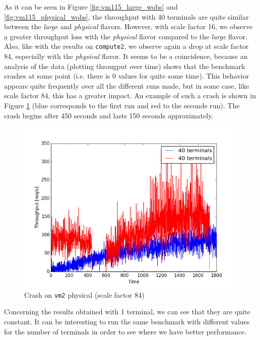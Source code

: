 As it can be seen in Figure \ref{fig:vm115_large_wobs} and \ref{fig:vm115_physical_wobs}, the throughput with 40 terminals are quite similar between the \textit{large} and \textit{physical} flavors. 
However, with scale factor 16, we observe a greater throughput loss with the \textit{physical} flavor compared to the \textit{large} flavor. 
Also, like with the results on \texttt{compute2}, we observe again a drop at scale factor 84, especially with the \textit{physical} flavor. 
It seems to be a coincidence, because an analysis of the data (plotting througput over time) shows that the benchmark crashes at some point (i.e. there is 0 values for quite some time).
This behavior appears quite frequently over all the different runs made, but in some case, like scale factor 84, this has a greater impact.
An example of such a crash is shown in Figure \ref{fig:vm115_physical_wobs_crash} (blue corresponds to the first run and red to the seconde run).
The crash begins after 450 seconds and lasts 150 seconds approximately.

\begin{figure}[h]
	\centering
	\includegraphics[scale=0.5]{figures/results/vm115_physical_wobs_crash.png}
	\caption{Crash on \texttt{vm2} physical (scale factor 84)}
	\label{fig:vm115_physical_wobs_crash}
\end{figure}

Concerning the results obtained with 1 terminal, we can see that they are quite constant.
It can be interesting to run the same benchmark with different values for the number of terminals in order to see where we have better performance.

